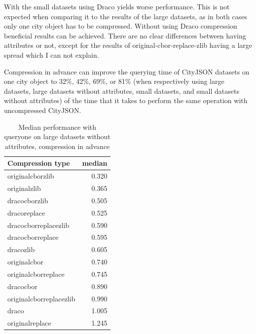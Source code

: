 With the small datasets using Draco yields worse performance.
This is not expected when comparing it to the results of the large datasets, as in both cases only one city object has to be compressed.
Without using Draco compression beneficial results can be achieved.
There are no clear differences between having attributes or not, except for the results of original-cbor-replace-zlib having a large spread which I can not explain.

Compression in advance can improve the querying time of CityJSON datasets on one city object to 32\%, 42\%, 69\%, or 81\% (when respectively using large datasets, large datasets without attributes, small datasets, and small datasets without attributes) of the time that it takes to perform the same operation with uncompressed CityJSON.


  \begin{table}[!h]
    \begin{minipage}{.5\linewidth}
      \caption{
Median performance with queryone on large datasets, compression in advance}
\centering

\begin{tabular}{|l|r|}
\hline
Compression type & median\\
\hline
originalcborzlib & 0.320\\
\hline
originalzlib & 0.365\\
\hline
dracocborzlib & 0.505\\
\hline
dracoreplace & 0.525\\
\hline
dracocborreplacezlib & 0.590\\
\hline
dracocborreplace & 0.595\\
\hline
dracozlib & 0.605\\
\hline
originalcbor & 0.740\\
\hline
originalcborreplace & 0.745\\
\hline
dracocbor & 0.890\\
\hline
originalcborreplacezlib & 0.990\\
\hline
draco & 1.005\\
\hline
originalreplace & 1.245\\
\hline
\end{tabular}
\end{minipage}%
    \begin{minipage}{.5\linewidth}
      \centering
        \caption{
Median performance with queryone on large datasets without attributes, compression in advance}


\end{minipage}
\end{table}
